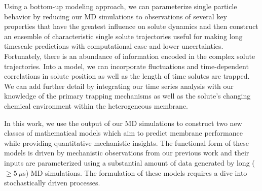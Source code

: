 \documentclass{article}
\begin{document}
  Using a bottom-up modeling approach, we can parameterize single particle behavior
  by reducing our MD simulations to observations of several key properties
  that have the greatest influence on solute dynamics and then construct an ensemble 
  of characteristic single solute trajectories useful for making long timescale
  predictions with computational ease and lower uncertainties. Fortunately, there 
  is an abundance of information encoded in the complex solute trajectories. Into a
  model, we can incorporate fluctuations and time-dependent correlations in solute
  position as well as the length of time solutes are trapped. We can add further
  detail by integrating our time series analysis with our knowledge of the primary
  trapping mechanisms as well as the solute's changing chemical environment within
  the heterogeneous membrane. 

  
  In this work, we use the output of our MD simulations to construct two new classes of 
  mathematical models which aim to predict membrane performance while providing quantitative 
  mechanistic insights. The functional form of these models is driven by mechanistic 
  observations from our previous work and their inputs are parameterized using a 
  substantial amount of data generated by long ($\geq 5~\mu$s) MD simulations. The formulation
  of these models requires a dive into stochastically driven processes.
  
%  
  
\end{document}
